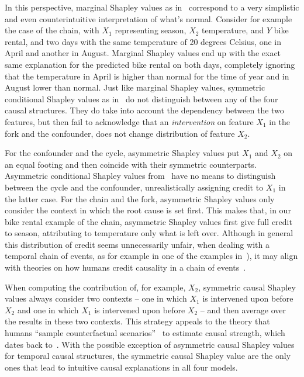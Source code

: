 \documentclass{article}
\begin{document}
In this perspective, marginal Shapley values as in~\cite{datta2016algorithmic,janzing2019feature,lundberg2020local} correspond to a very simplistic and even counterintuitive interpretation of what's normal. Consider for example the case of the chain, with $X_1$ representing season, $X_2$ temperature, and $Y$ bike rental, and two days with the same temperature of 20 degrees Celsius, one in April and another in August. Marginal Shapley values end up with the exact same explanation for the predicted bike rental on both days, completely ignoring that the temperature in April is higher than normal for the time of year and in August lower than normal. Just like marginal Shapley values, symmetric conditional Shapley values as in~\cite{aas2019explaining} do not distinguish between any of the four causal structures. They do take into account the dependency between the two features, but then fail to acknowledge that an {\em intervention} on feature $X_1$ in the fork and the confounder, does not change distribution of feature $X_2$.

For the confounder and the cycle, asymmetric Shapley values put $X_1$ and $X_2$ on an equal footing and then coincide with their symmetric counterparts. Asymmetric conditional Shapley values from~\cite{frye2019asymmetric} have no means to distinguish between the cycle and the confounder, unrealistically assigning credit to $X_1$ in the latter case. For the chain and the fork, asymmetric Shapley values only consider the context in which the root cause is set first. This makes that, in our bike rental example of the chain, asymmetric Shapley values first give full credit to season, attributing to temperature only what is left over.
Although in general this distribution of credit seems unnecessarily unfair, when dealing with a temporal chain of events, as for example in one of the examples in~\cite{frye2019asymmetric}), it may align with theories on how humans credit causality in a chain of events~\cite{spellman1997crediting}.

When computing the contribution of, for example, $X_2$, symmetric causal Shapley values always consider two contexts -- one in which $X_1$ is intervened upon before $X_2$ and one in which $X_1$ is intervened upon before $X_2$ -- and then average over the results in these two contexts. This strategy appeals to the theory that humans ``sample counterfactual scenarios''~\cite{icard2017normality} to estimate causal strength, which dates back to~\cite{lewis1974causation}. With the possible exception of asymmetric causal Shapley values for temporal causal structures, the symmetric causal Shapley value are the only ones that lead to intuitive causal explanations in all four models.
\end{document}
